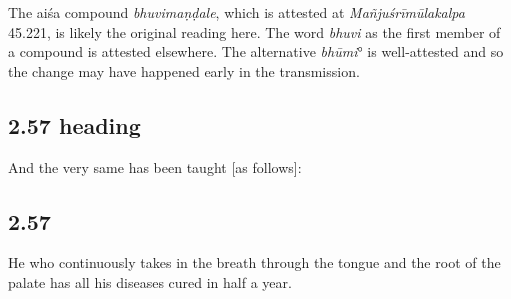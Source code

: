 \begin{ekdosis}
\begin{testimonia}[hp02_056]
\end{testimonia}

\begin{philcomm}[hp02_056]
The aiśa compound \emph{bhuvimaṇḍale}, which is attested at \emph{Mañjuśrīmūlakalpa} 45.221, is likely the original reading here. The word  \emph{bhuvi} as the first member of a compound is attested elsewhere. The alternative \emph{bhūmi}° is well-attested and so the change may have happened early in the transmission. 
\end{philcomm}


\subsection*{2.57 heading}
\begin{translation}[hp02_057a]
And the very same has been taught [as follows]:
\end{translation}


\subsection*{2.57}
\begin{translation}[hp02_057]
He who continuously takes in the breath through the tongue and the root of the palate has all his diseases cured in half a year.
\end{translation}


\end{ekdosis}
